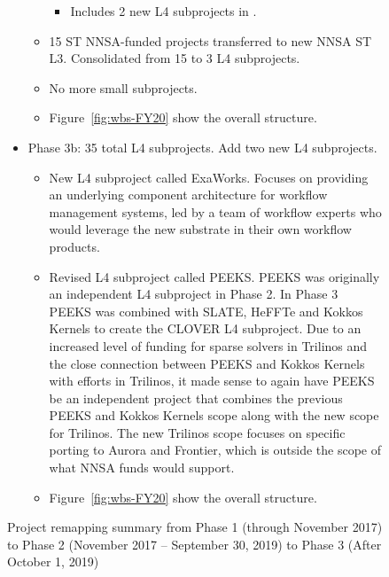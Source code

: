 \begin{figure}
\begin{mdframed}
\begin{itemize}
\begin{itemize}
\begin{itemize}
	\item Includes 2 new L4 subprojects in \ecosystem.
	\end{itemize}
	\item 15 ST NNSA-funded projects transferred to new NNSA ST L3. Consolidated from 15 to 3 L4 subprojects.
	\item No more small subprojects.
	\item Figure~\ref{fig:wbs-FY20} show the overall structure.
\end{itemize}
\item Phase 3b: 35 total L4 subprojects.  Add two new L4 subprojects.
\begin{itemize}
	\item New L4 subproject called ExaWorks.  Focuses on providing an underlying component architecture for workflow management systems, led by a team of workflow experts who would leverage the new substrate in their own workflow products.
	\item Revised L4 subproject called PEEKS.  PEEKS was originally an independent L4 subproject in Phase 2.  In Phase 3 PEEKS was combined with SLATE, HeFFTe and Kokkos Kernels to create the CLOVER L4 subproject.  Due to an increased level of funding for sparse solvers in Trilinos and the close connection between PEEKS and Kokkos Kernels with efforts in Trilinos, it made sense to again have PEEKS be an independent project that combines the previous PEEKS and Kokkos Kernels scope along with the new scope for Trilinos.  The new Trilinos scope focuses on specific porting to Aurora and Frontier, which is outside the scope of what NNSA funds would support.
	\item Figure~\ref{fig:wbs-FY20} show the overall structure.
\end{itemize}
\end{itemize}
\end{mdframed}

\caption{\label{fig:project-remapping}Project remapping summary from Phase 1 (through November 2017) to Phase 2 (November 2017 -- September 30, 2019) to Phase 3 (After October 1, 2019)}
\end{figure}


